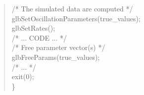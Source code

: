 {\begin{quote}
{{     \hspace*{0.5cm}  
   /* The simulated data are computed */ \\
   \hspace*{0.5cm} glbSetOscillationParameters(true\_values); \\
   \hspace*{0.5cm} glbSetRates(); \\
   
  \hspace*{0.5cm} /* ... CODE ... */ \\
  
\hspace*{0.5cm}  /* Free parameter vector(s) */ \\
\hspace*{0.5cm}  glbFreeParams(true\_values); \\
\hspace*{0.5cm} /* ... */ \\
 
  \hspace*{0.5cm}   exit(0); \\
\} 
}}
\end{quote}

}

